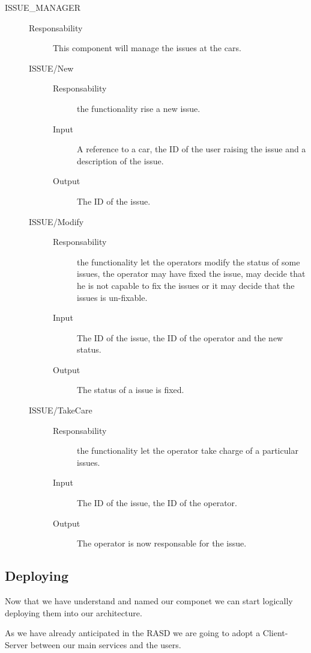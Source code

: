 \documentclass[11pt]{article} %
\begin{document}
\begin{description}
	\item[ISSUE\_MANAGER] \hfill
	\begin{description}
		\item[Responsability] This component will manage the issues at the cars.
	\item[ISSUE/New] \hfill
		\begin{description}
			\item[Responsability] the functionality rise a new issue.
			\item[Input] A reference to a car, the ID of the user raising the issue and a description of the issue.
			\item[Output] The ID of the issue.
		\end{description}
	\item[ISSUE/Modify] \hfill
		\begin{description}
			\item[Responsability] the functionality let the operators modify the status of some issues, the operator may have fixed the issue, may decide that he is not capable to fix the issues or it may decide that the issues is un-fixable.
			\item[Input] The ID of the issue, the ID of the operator and the new status.
			\item[Output] The status of a issue is fixed.
		\end{description}
	\item[ISSUE/TakeCare] \hfill
		\begin{description}
			\item[Responsability] the functionality let the operator take charge of a particular issues.
			\item[Input] The ID of the issue, the ID of the operator.
			\item[Output] The operator is now responsable for the issue.
		\end{description}
	\end{description}

\end{description}

\subsection{Deploying}

Now that we have understand and named our componet we can start logically deploying them into our architecture.

As we have already anticipated in the RASD we are going to adopt a Client-Server between our main services and the users.
\end{document}
